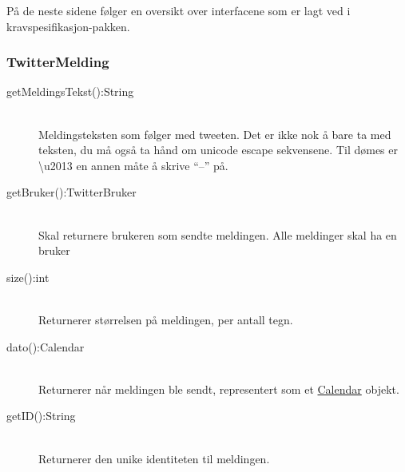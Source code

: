\documentclass{article}
\begin{document}
På de neste sidene følger en oversikt over interfacene som er lagt ved i kravspesifikasjon-pakken.


\newpage

\subsubsection{TwitterMelding}
\label{subsec:TwitterMelding}

\begin{description}
\item [getMeldingsTekst():String] \ \\ %
  Meldingsteksten som følger med tweeten.
  Det er ikke nok å bare ta med teksten, du må også ta hånd om unicode escape sekvensene. Til dømes er \textbackslash u2013 en annen måte å skrive ``–'' på.
\item [getBruker():TwitterBruker] \ \\
  Skal returnere brukeren som sendte meldingen.
  Alle meldinger skal ha en bruker
\item [size():int] \ \\
  Returnerer størrelsen på meldingen, per antall tegn.
\item [dato():Calendar] \ \\
  Returnerer når meldingen ble sendt, representert som et \href{http://docs.oracle.com/javase/7/docs/api/java/util/Calendar.html}{Calendar} objekt.
\item [getID():String] \ \\
  Returnerer den unike identiteten til meldingen.
\end{description}
\newpage
\end{document}
